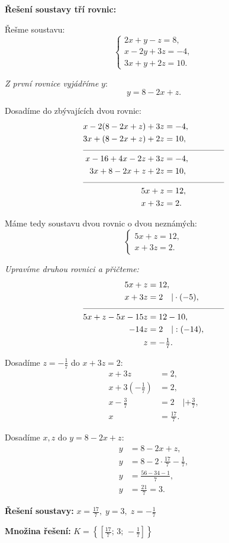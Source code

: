 \documentclass[12pt,a4paper]{article}
\begin{document}
\begin{examplebox}
\textbf{Řešení soustavy tří rovnic:}

Řešme soustavu:
\[
\begin{cases}
2x + y - z = 8,\\
x - 2y + 3z = -4,\\
3x + y + 2z = 10.
\end{cases}
\]

\textit{Z první rovnice vyjádříme } \(y\):
\[
y = 8 - 2x + z.
\]

Dosadíme do zbývajících dvou rovnic:
\begin{align*}
x - 2(8 - 2x + z) + 3z &= -4,\\
3x + (8 - 2x + z) + 2z &= 10,\\[-4pt]
\multicolumn{2}{c}{\rule{6cm}{0.3pt}}\\[-2pt]
x - 16 + 4x - 2z + 3z &= -4,\\
3x + 8 - 2x + z + 2z &= 10,\\[-4pt]
\multicolumn{2}{c}{\rule{6cm}{0.3pt}}\\[-2pt]
5x + z &= 12,\\
x + 3z &= 2.
\end{align*}

Máme tedy soustavu dvou rovnic o dvou neznámých:
\[
\begin{cases}
5x + z = 12,\\
x + 3z = 2.
\end{cases}
\]

\textit{Upravíme druhou rovnici a přičteme:}
\begin{align*}
5x + z &= 12,\\
x + 3z &= 2 \quad | \cdot(-5),\\[-4pt]
\multicolumn{2}{c}{\rule{6cm}{0.3pt}}\\[-2pt]
5x + z - 5x - 15z &= 12 - 10,\\
-14z &= 2 \quad | :(-14),\\
z &= -\tfrac{1}{7}.
\end{align*}

Dosadíme \(z = -\tfrac{1}{7}\) do \(x + 3z = 2\):
\begin{align*}
x + 3z &= 2,\\
x + 3\left(-\tfrac{1}{7}\right) &= 2,\\
x - \tfrac{3}{7} &= 2 \quad | +\tfrac{3}{7},\\
x &= \tfrac{17}{7}.
\end{align*}

Dosadíme \(x, z\) do \(y = 8 - 2x + z\):
\begin{align*}
y &= 8 - 2x + z,\\
y &= 8 - 2\cdot\tfrac{17}{7} - \tfrac{1}{7},\\
y &= \tfrac{56 - 34 - 1}{7},\\
y &= \tfrac{21}{7} = 3.
\end{align*}

\textbf{Řešení soustavy:} \quad \(x = \tfrac{17}{7},\; y = 3,\; z = -\tfrac{1}{7}\)

\medskip
\textbf{Množina řešení:} \quad \(K = \left\{\left[\tfrac{17}{7};\,3;\,-\tfrac{1}{7}\right]\right\}\)
\end{examplebox}
\end{document}
